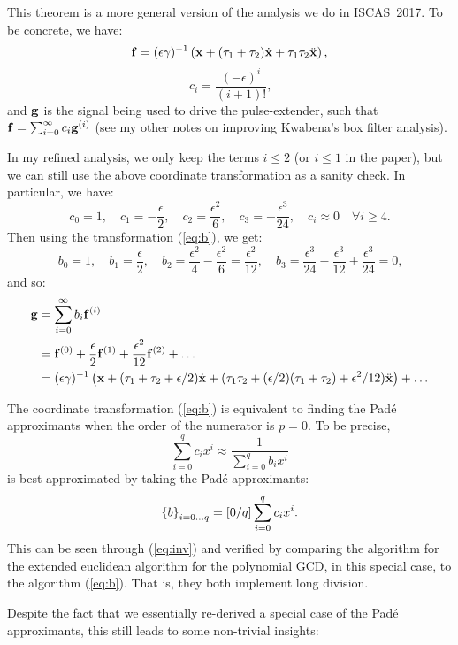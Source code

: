 
This theorem is a more general version of the analysis we do in ISCAS~2017. To be concrete, we have:
$$
\mathbf{f} = (\epsilon \gamma)^{-1} \left( \mathbf{x} + (\tau_1 + \tau_2) \dot{\mathbf{x}} + \tau_1 \tau_2 \ddot{\mathbf{x}} \right) \text{,}
$$
$$
c_i = \frac{(-\epsilon)^i}{(i + 1)!} \text{,}
$$
and $\mathbf{g}$ is the signal being used to drive the pulse-extender, such that $\mathbf{f} = \sum_{i=0}^\infty c_i \mathbf{g}^{(i)}$ (see my other notes on improving Kwabena's box filter analysis).

In my refined analysis, we only keep the terms $i \le 2$ (or $i \le 1$ in the paper), but we can still use the above coordinate transformation as a sanity check. In particular, we have:
$$
c_0 = 1, \quad c_1 = -\frac{\epsilon}{2}, \quad c_2 = \frac{\epsilon^2}{6}, \quad c_3 = -\frac{\epsilon^3}{24}, \quad c_i \approx 0 \quad \forall i \ge 4 \text{.}
$$
Then using the transformation (\ref{eq:b}), we get:
$$
b_0 = 1, \quad b_1 = \frac{\epsilon}{2}, \quad b_2 = \frac{\epsilon^2}{4} - \frac{\epsilon^2}{6} = \frac{\epsilon^2}{12}, \quad b_3 = \frac{\epsilon^3}{24} - \frac{\epsilon^3}{12} + \frac{\epsilon^3}{24} = 0 \text{,}
$$
and so:
\begin{align*}
\mathbf{g} &= \sum_{i=0}^\infty b_i \mathbf{f}^{(i)} \\
        &= \mathbf{f}^{(0)} + \frac{\epsilon}{2} \mathbf{f}^{(1)} + \frac{\epsilon^2}{12} \mathbf{f}^{(2)} + \ldots \\
        &= (\epsilon \gamma)^{-1} \left( \mathbf{x} + (\tau_1 + \tau_2 + \epsilon / 2) \dot{\mathbf{x}} + (\tau_1 \tau_2 + (\epsilon / 2 ) (\tau_1 + \tau_2) + \epsilon^2 / 12) \ddot{\mathbf{x}} \right) + \ldots
\end{align*}

The coordinate transformation (\ref{eq:b}) is equivalent to finding the Pad\'e approximants when the order of the numerator is $p = 0$.
To be precise,
$$
\sum_{i=0}^{q} c_i x^i \approx \frac{1}{\sum_{i=0}^q b_i x^i}
$$
is best-approximated by taking the Pad\'e approximants:
$$
\left\{ b \right\}_{i=0 \ldots q} = \left[ 0 / q \right] \sum_{i=0}^{q} c_i x^i \text{.}
$$
This can be seen through (\ref{eq:inv}) and verified by comparing the algorithm for the extended euclidean algorithm for the polynomial GCD, in this special case, to the algorithm (\ref{eq:b}). That is, they both implement long division.

Despite the fact that we essentially re-derived a special case of the Pad\'e approximants, this still leads to some non-trivial insights:

